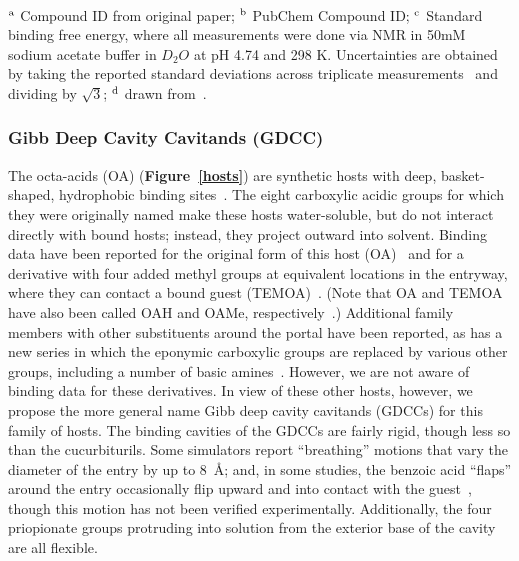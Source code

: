 \documentclass[aps,pre,twocolumn,nofootinbib,superscriptaddress,10pt, final,tightenlines]{revtex4-1}
\begin{document}
\begin{table}
\begin{tabular}{lllp{2cm}>{\ttfamily}lS[table-format=-1.2, table-figures-uncertainty=1]}
\bottomrule
\end{tabular}                                                                                                                                                                                                                                                           \\
$^{\rm a}$ Compound ID from original paper; $^{\rm b}$ PubChem Compound ID; $^{\rm c}$ Standard binding free energy, where all measurements were done via NMR in 50mM sodium acetate buffer in $D_2O$ at pH 4.74 and 298 K. Uncertainties are obtained by taking the reported standard deviations across triplicate measurements~\cite{isaacs_personal_2016} and dividing by $\sqrt 3$;  $^{\rm d}$ drawn from~\cite{liu_cucurbituril_2005}.
\end{table}
\endgroup


\subsubsection{Gibb Deep Cavity Cavitands (GDCC)}


The octa-acids (OA) ({\bf Figure~\ref{hosts}}) are synthetic hosts with deep, basket-shaped, hydrophobic binding sites~\cite{gibb_well-defined_2004}. 
The eight carboxylic acidic groups for which they were originally named make these hosts water-soluble, but do not interact directly with bound hosts; instead, they project outward into solvent. 
Binding data have been reported for the original form of this host (OA)~\cite{gibb_well-defined_2004} and for a derivative with four added methyl groups at equivalent locations in the entryway, where they can contact a bound guest (TEMOA)~\cite{gan_nonmonotonic_2011, sullivan_binding_2016}. 
(Note that OA and TEMOA have also been called OAH and OAMe, respectively~\cite{yin_sampl5_preprint}.) 
Additional family members with other substituents around the portal have been reported, as has a new series in which the eponymic carboxylic groups are replaced by various other groups, including a number of basic amines~\cite{hillyer_synthesis_2016}. 
However, we are not aware of binding data for these derivatives. 
In view of these other hosts, however, we propose the more general name Gibb deep cavity cavitands (GDCCs) for this family of hosts. 
The binding cavities of the GDCCs are fairly rigid, though less so than the cucurbiturils. 
Some simulators report ``breathing'' motions that vary the diameter of the entry by up to 8~\AA \cite{mikulskis_free-energy_2014}; and, in some studies, the benzoic acid ``flaps'' around the entry occasionally flip upward and into contact with the guest~\cite{yin_sampl5_2016, tofoleanu_absolute_2016}, though this motion has not been verified experimentally. 
Additionally, the four priopionate groups protruding into solution from the exterior base of the cavity are all flexible. 
\end{document}
